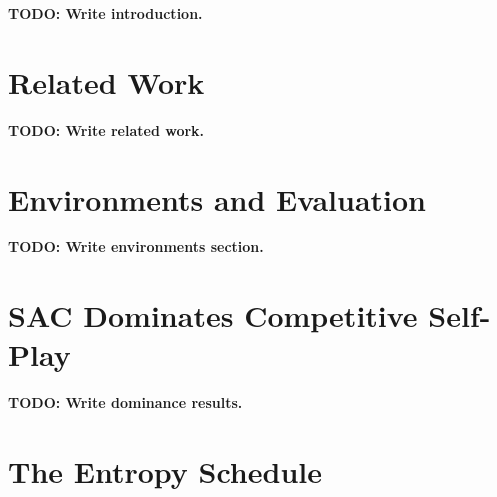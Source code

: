 \documentclass[letterpaper]{article}
\begin{document}
\textbf{TODO: Write introduction.}

\section{Related Work}
\label{sec:related}


\textbf{TODO: Write related work.}

\section{Environments and Evaluation}
\label{sec:env}


\textbf{TODO: Write environments section.}

\section{SAC Dominates Competitive Self-Play}
\label{sec:dominance}


\textbf{TODO: Write dominance results.}

\section{The Entropy Schedule}
\label{sec:entropy}
\end{document}
